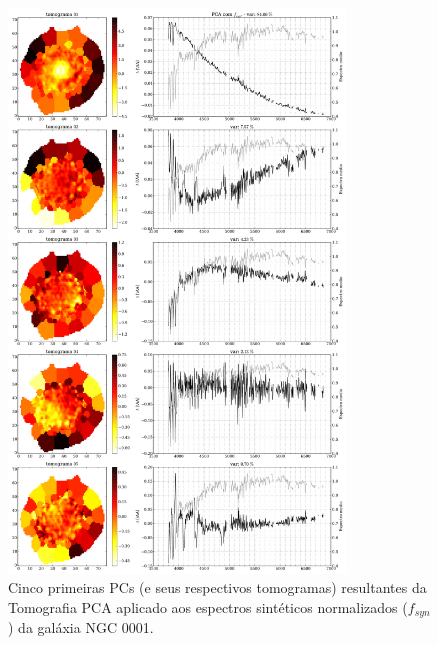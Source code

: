 \begin{figure}
    \includegraphics[width=0.8\textwidth]{figuras/K0008-tomo-syn-norm.pdf}
    \caption[Tomogramas de 1 a 5 para o cubo $f_{syn}$ - NGC 0001.]
    {Cinco primeiras PCs (e seus respectivos tomogramas) resultantes da Tomografia PCA aplicado aos espectros sintéticos
    normalizados ($f_{syn}$) da galáxia NGC 0001.}
    \label{fig:K0008tomofsynnorm}
\end{figure}

